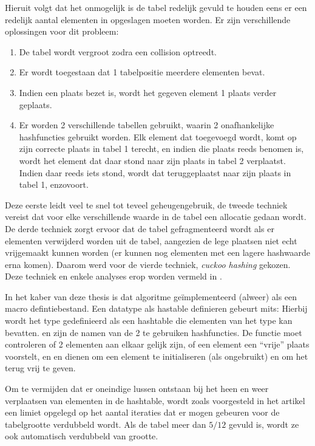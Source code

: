 Hieruit volgt dat het onmogelijk is de tabel redelijk gevuld te houden eens er een redelijk aantal elementen in opgeslagen moeten worden. Er zijn verschillende oplossingen voor dit probleem: \begin{enumerate}
\item De tabel wordt vergroot zodra een collision optreedt.
\item Er wordt toegestaan dat 1 tabelpositie meerdere elementen bevat.
\item Indien een plaats bezet is, wordt het gegeven element 1 plaats verder geplaats.
\item Er worden 2 verschillende tabellen gebruikt, waarin 2 onafhankelijke hashfuncties gebruikt worden. Elk element dat toegevoegd wordt, komt op zijn correcte plaats in tabel 1 terecht, en indien die plaats reeds benomen is, wordt het element dat daar stond naar zijn plaats in tabel 2 verplaatst. Indien daar reeds iets stond, wordt dat teruggeplaatst naar zijn plaats in tabel 1, enzovoort.
\end{enumerate}

Deze eerste leidt veel te snel tot teveel geheugengebruik, de tweede techniek vereist dat voor elke verschillende waarde in de tabel een allocatie gedaan wordt. De derde techniek zorgt ervoor dat de tabel gefragmenteerd wordt als er elementen verwijderd worden uit de tabel, aangezien de lege plaatsen niet echt vrijgemaakt kunnen worden (er kunnen nog elementen met een lagere hashwaarde erna komen). Daarom werd voor de vierde techniek, {\em cuckoo hashing} gekozen. Deze techniek en enkele analyses erop worden vermeld in \cite{cuckoo}.

In het kaber van deze thesis is dat algoritme ge\"implementeerd (alweer) als een macro defintiebestand. Een datatype als hastable definieren gebeurt mits:
Hierbij wordt het type  gedefinieerd als een hashtable die elementen van het type  kan bevatten.  en  zijn de namen van de 2 te gebruiken hashfuncties. De functie  moet controleren of 2 elementen aan elkaar gelijk zijn,  of een element een ``vrije'' plaats voorstelt, en  en  dienen om een element te initialiseren (als ongebruikt) en om het terug vrij te geven.

Om te vermijden dat er oneindige lussen ontstaan bij het heen en weer verplaatsen van elementen in de hashtable, wordt zoals voorgesteld in het artikel een limiet opgelegd op het aantal iteraties dat er mogen gebeuren voor de tabelgrootte verdubbeld wordt. Als de tabel meer dan $5/12$ gevuld is, wordt ze ook automatisch verdubbeld van grootte.

